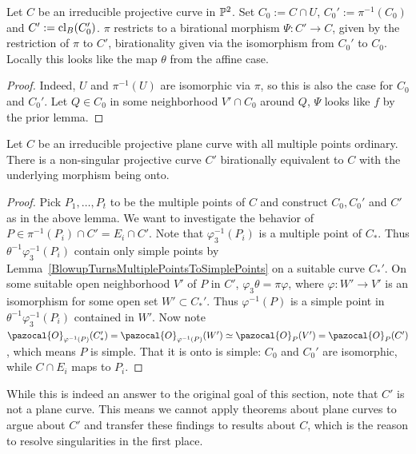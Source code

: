     \begin{lemma}
        Let $C$ be an irreducible projective curve in $\mathbb{P}^2$. Set $C_0:= C\cap U$, $C_0':=\pi^{-1}(C_0)$ and $C':=\mathrm{cl}_B(C_0')$. $\pi$ restricts to a birational morphism $\Psi:C'\rightarrow C$, given by the restriction of $\pi$ to $C'$, birationality given via the isomorphism from $C_0'$ to $C_0$. Locally this looks like the map $\theta$ from the affine case. 
    \end{lemma}
    \begin{proof}
        Indeed, $U$ and $\pi^{-1}(U)$ are isomorphic via $\pi$, so this is also the case for $C_0$ and $C_0'$. Let $Q\in C_0$ in some neighborhood $V'\cap C_0$ around $Q$, $\Psi$ looks like $f$ by the prior lemma. 
    \end{proof}
    \begin{theorem}\label{WhenCurveHasOnlyOrdinaryMultiplePointsIsBirationallyEquivalnetToNonsingularCurve}
        Let $C$ be an irreducible projective plane curve with all multiple points ordinary. There is a non-singular projective curve $C'$ birationally equivalent to $C$ with the underlying morphism being onto. 
    \end{theorem}
    \begin{proof}
        Pick $P_1,\dots,P_t$ to be the multiple points of $C$ and construct $C_0,C_0'$ and $C'$ as in the above lemma. We want to investigate the behavior of $P\in \pi^{-1}(P_i)\cap C' = E_i\cap C'$.
    Note that $\varphi_3^{-1}(P_i)$ is a multiple point of $C_\ast$. Thus $\theta^{-1}\varphi_3^{-1}(P_i)$ contain only simple points by Lemma~\ref{BlowupTurnsMultiplePointsToSimplePoints} on a suitable curve $C_\ast'$. On some suitable open neighborhood $V'$ of $P$ in $C'$, $\varphi_3\theta = \pi \varphi$, where $\varphi: W'\rightarrow V'$ is an isomorphism for some open set $W'\subset C_\ast'$. Thus $\varphi^{-1}(P)$ is a simple point in $\theta^{-1}\varphi_3^{-1}(P_i)$ contained in $W'$. Now note $\pazocal{O}_{\varphi^{-1}(P)}(C_\ast') = \pazocal{O}_{\varphi^{-1}(P)}(W') \simeq\pazocal{O}_P(V')= \pazocal{O}_P(C')$, which means $P$ is simple. That it is onto is simple: $C_0$ and $C_0'$ are isomorphic, while $C\cap E_i$ maps to $P_i$.
    \end{proof}
    \begin{remark}
        While this is indeed an answer to the original goal of this section, note that $C'$ is not a plane curve. This means we cannot apply theorems about plane curves to argue about $C'$ and transfer these findings to results about $C$, which is the reason to resolve singularities in the first place.  
    \end{remark}
